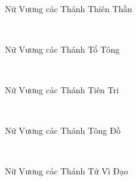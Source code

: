 \documentclass[12pt]{article}
\begin{document}
\begin{paracol}{2}
\begin{leftcolumn*}
\Large{\ \ \ }\\
\end{leftcolumn*}

\begin{rightcolumn}
Nữ Vương các Thánh Thiên Thần\\
\end{rightcolumn}

\begin{leftcolumn*}
\Large{\ \ \ }\\
\end{leftcolumn*}

\begin{rightcolumn}
Nữ Vương các Thánh Tổ Tông\\
\end{rightcolumn}

\begin{leftcolumn*}
\Large{\ \ \ }\\
\end{leftcolumn*}

\begin{rightcolumn}
Nữ Vương các Thánh Tiên Tri\\
\end{rightcolumn}

\begin{leftcolumn*}
\Large{\ \ \ }\\
\end{leftcolumn*}

\begin{rightcolumn}
Nữ Vương các Thánh Tông Đồ\\
\end{rightcolumn}

\begin{leftcolumn*}
\Large{\ \ \ \ \ \ }\\
\end{leftcolumn*}

\begin{rightcolumn}
Nữ Vương các Thánh Tử Vì Đạo\\
\end{rightcolumn}

\begin{leftcolumn*}
\Large{\ \ \ \ \ \ }\\
\end{leftcolumn*}


\end{paracol}
\end{document}
